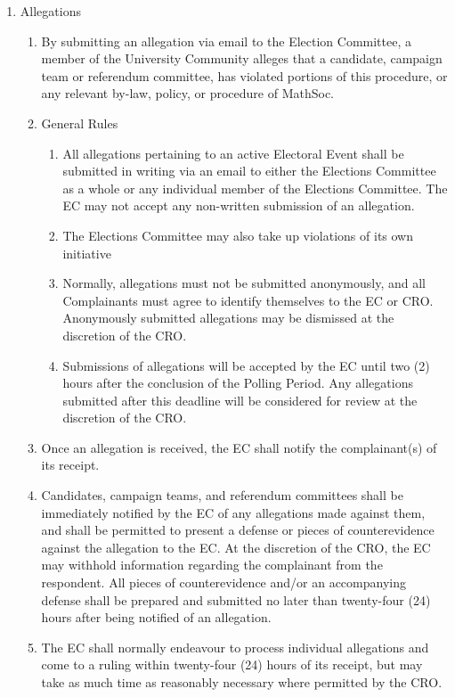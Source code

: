 \begin{enumerate}
	\item Allegations
		\begin{enumerate}
			\item By submitting an allegation via email to the Election Committee, a member of the University Community alleges that a candidate, campaign team or referendum committee, has violated portions of this procedure, or any relevant by-law, policy, or procedure of MathSoc.
			\item General Rules 
				\begin{enumerate}
					\item All allegations pertaining to an active Electoral Event shall be submitted in writing via an email to either the Elections Committee as a whole or any individual member of the Elections Committee. The EC may not accept any non-written submission of an allegation.
					\item The Elections Committee may also take up violations of its own initiative
					\item Normally, allegations must not be submitted anonymously, and all Complainants must agree to identify themselves to the EC or CRO. Anonymously submitted allegations may be dismissed at the discretion of the CRO.
					\item Submissions of allegations will be accepted by the EC until two (2) hours after the conclusion of the Polling Period. Any allegations submitted after this deadline will be considered for review at the discretion of the CRO.
				\end{enumerate}
			\item Once an allegation is received, the EC shall notify the complainant(s) of its receipt.
			\item Candidates, campaign teams, and referendum committees shall be immediately notified by the EC of any allegations made against them, and shall be permitted to present a defense or pieces of counterevidence against the allegation to the EC. At the discretion of the CRO, the EC may withhold information regarding the complainant from the respondent. All pieces of counterevidence and/or an accompanying defense shall be prepared and submitted no later than twenty-four (24) hours after being notified of an allegation.
			\item The EC shall normally endeavour to process individual allegations and come to a ruling within twenty-four (24) hours of its receipt, but may take as much time as reasonably necessary where permitted by the CRO.

\end{enumerate}
\end{enumerate}
